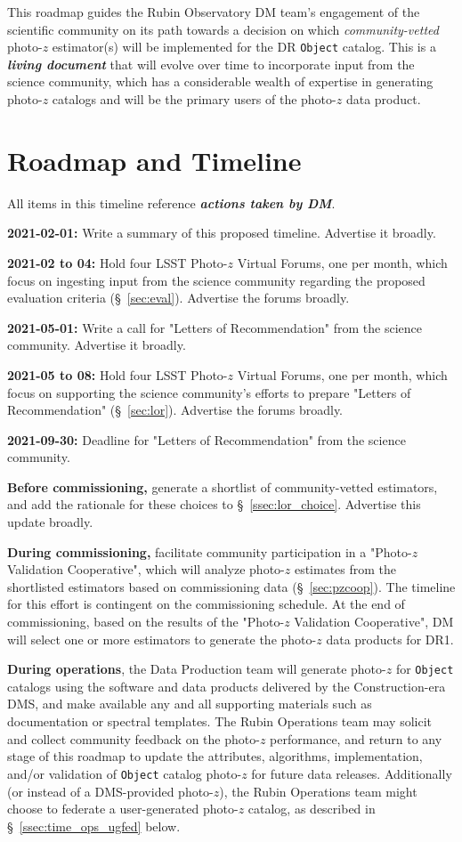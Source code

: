 \documentclass[DM,lsstdraft,toc]{lsstdoc}
\begin{document}
This roadmap guides the Rubin Observatory DM team's engagement of the scientific community on its path towards a decision on which \textit{community-vetted} photo-$z$ estimator(s) will be implemented for the DR {\tt Object} catalog.
This is a \textit{\textbf{living document}} that will evolve over time to incorporate input from the science community, which has a considerable wealth of expertise in generating photo-$z$ catalogs and will be the primary users of the photo-$z$ data product.


\section{Roadmap and Timeline}\label{sec:time}

All items in this timeline reference \textbf{\textit{actions taken by DM}}.

{\bf 2021-02-01:} Write a summary of this proposed timeline. Advertise it broadly.

{\bf 2021-02 to 04:} Hold four LSST Photo-$z$ Virtual Forums, one per month, which focus on ingesting input from the science community regarding the proposed evaluation criteria (\S~\ref{sec:eval}). Advertise the forums broadly.

{\bf 2021-05-01:} Write a call for "Letters of Recommendation" from the science community. Advertise it broadly.

{\bf 2021-05 to 08:} Hold four LSST Photo-$z$ Virtual Forums, one per month, which focus on supporting the science community's efforts to prepare "Letters of Recommendation" (\S~\ref{sec:lor}). Advertise the forums broadly.

{\bf 2021-09-30:} Deadline for "Letters of Recommendation" from the science community.

{\bf Before commissioning,} generate a shortlist of community-vetted estimators, and add the rationale for these choices to \S~\ref{ssec:lor_choice}. Advertise this update broadly.

{\bf During commissioning,} facilitate community participation in a "Photo-$z$ Validation Cooperative", which will analyze photo-$z$ estimates from the shortlisted estimators based on commissioning data (\S~\ref{sec:pzcoop}).
The timeline for this effort is contingent on the commissioning schedule.
At the end of commissioning, based on the results of the "Photo-$z$ Validation Cooperative", DM will select one or more estimators to generate the photo-$z$ data products for DR1.

{\bf During operations}, the Data Production team will generate photo-$z$ for {\tt Object} catalogs using the software and data products delivered by the Construction-era DMS, and make available any and all supporting materials such as documentation or spectral templates.
The Rubin Operations team may solicit and collect community feedback on the photo-$z$ performance, and return to any stage of this roadmap to update the attributes, algorithms, implementation, and/or validation of {\tt Object} catalog photo-$z$ for future data releases.
Additionally (or instead of a DMS-provided photo-$z$), the Rubin Operations team might choose to federate a user-generated photo-$z$ catalog, as described in \S~\ref{ssec:time_ops_ugfed} below.
\end{document}
